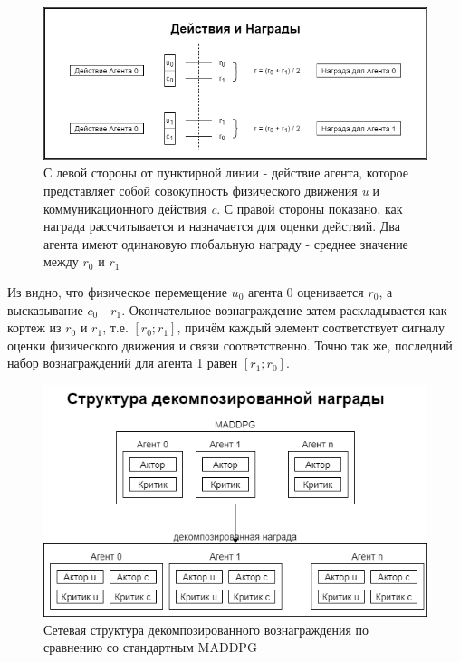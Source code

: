 \begin{figure}[ht!]
    \center
    \includegraphics [scale=0.60] {my_folder/images/ch4/actions_and_rewards.png}
    \caption{С левой стороны от пунктирной линии - действие агента, которое представляет собой совокупность физического движения \textit{u} и коммуникационного действия \textit{c}. С правой стороны показано, как награда рассчитывается и назначается для оценки действий. Два агента имеют одинаковую глобальную награду - среднее значение между $r_0$ и $r_1$}
    \label{fig:action-reward}
\end{figure}

Из  видно, что физическое перемещение $u_0$ агента 0 оценивается $r_0$, а высказывание $c_0$ - $r_1$. Окончательное вознаграждение затем раскладывается как кортеж из $r_0$ и $r_1$, т.е. $[r_0; r_1]$, причём каждый элемент соответствует сигналу оценки физического движения и связи соответственно. Точно так же, последний набор вознаграждений для агента 1 равен $[r_1; r_0]$.

\begin{figure}[ht!]
    \center
    \includegraphics [scale=0.60] {my_folder/images/ch4/decomposed_reward_structure.png}
    \caption{Сетевая структура декомпозированного вознаграждения по сравнению со стандартным MADDPG}
    \label{fig:decomposed-reward-structure}
\end{figure}

